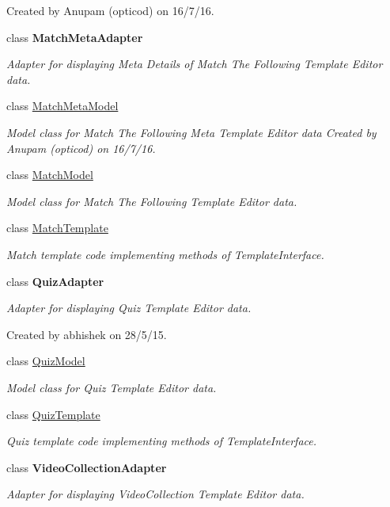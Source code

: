 \begin{DoxyCompactItemize}
\begin{DoxyCompactList}
Created by Anupam (opticod) on 16/7/16. \end{DoxyCompactList}\item 
class {\bfseries Match\+Meta\+Adapter}
\begin{DoxyCompactList}\small\item\em Adapter for displaying Meta Details of Match The Following Template Editor data. \end{DoxyCompactList}\item 
class \hyperlink{classorg_1_1buildmlearn_1_1toolkit_1_1templates_1_1MatchMetaModel}{Match\+Meta\+Model}
\begin{DoxyCompactList}\small\item\em Model class for Match The Following Meta Template Editor data Created by Anupam (opticod) on 16/7/16. \end{DoxyCompactList}\item 
class \hyperlink{classorg_1_1buildmlearn_1_1toolkit_1_1templates_1_1MatchModel}{Match\+Model}
\begin{DoxyCompactList}\small\item\em Model class for Match The Following Template Editor data. \end{DoxyCompactList}\item 
class \hyperlink{classorg_1_1buildmlearn_1_1toolkit_1_1templates_1_1MatchTemplate}{Match\+Template}
\begin{DoxyCompactList}\small\item\em Match template code implementing methods of Template\+Interface. \end{DoxyCompactList}\item 
class {\bfseries Quiz\+Adapter}
\begin{DoxyCompactList}\small\item\em Adapter for displaying Quiz Template Editor data. 

Created by abhishek on 28/5/15. \end{DoxyCompactList}\item 
class \hyperlink{classorg_1_1buildmlearn_1_1toolkit_1_1templates_1_1QuizModel}{Quiz\+Model}
\begin{DoxyCompactList}\small\item\em Model class for Quiz Template Editor data. \end{DoxyCompactList}\item 
class \hyperlink{classorg_1_1buildmlearn_1_1toolkit_1_1templates_1_1QuizTemplate}{Quiz\+Template}
\begin{DoxyCompactList}\small\item\em Quiz template code implementing methods of Template\+Interface. \end{DoxyCompactList}\item 
class {\bfseries Video\+Collection\+Adapter}
\begin{DoxyCompactList}\small\item\em Adapter for displaying Video\+Collection Template Editor data. 


\end{DoxyCompactList}
\end{DoxyCompactItemize}
